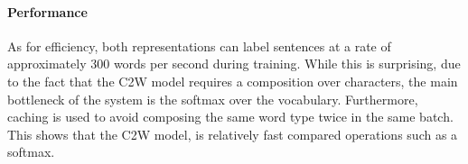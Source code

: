 \documentclass[11pt]{article}
\newcommand{\ignore}[1]{}
\begin{document}
\begin{CJK*}{UTF8}{gbsn}
\paragraph{Performance}
As for efficiency, both representations can label sentences at a rate of approximately 300 words per second during training. While this is surprising, due to the fact that the C2W model requires a composition over characters, the main bottleneck of the system is the softmax over the vocabulary. Furthermore, caching is used to avoid composing the same word type twice in the same batch. This shows that the C2W model, is relatively fast compared operations such as a softmax.

\begin{table}
\begin{center}
\end{center}
\caption{\label{lang} Language Modeling Results}
\end{table}

\ignore{\paragraph{Word Representations}

While the C2W model does not keep word vectors explicitly, we can still look at word similarity tasks by generating words representations from a list of words. Thus, we generate continuous representations for all words in our English Wikipedia dataset to evaluate what the model is learning. Table~\ref{top-10} shows the 10-closest words ranked by cosine distance in vector space for the terms ``increased" and ``John" using the C2W model. We observe from this list that while the C2W model does prefer to group words with similar suffixes, it can effectively group words that are semantically similar. For word ``increased,'' we can see that the closest words are other verbs that have similar suffixes but also similar meanings. For the proper noun ``John", the list contains other names that are lexically divergent.}


\end{CJK*}
\end{document}
